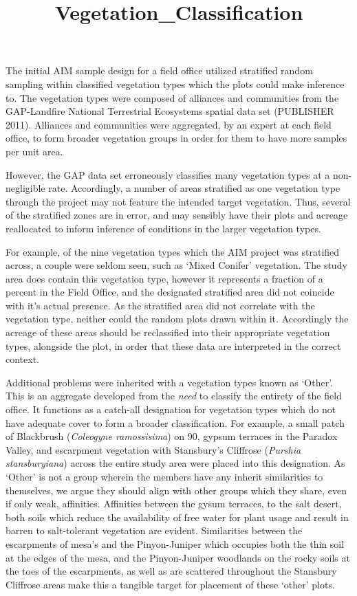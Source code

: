 \documentclass[
]{article}
\title{Vegetation\_Classification}
\author{}
\date{\vspace{-2.5em}}
\begin{document}
\maketitle

The initial AIM sample design for a field office utilized stratified
random sampling within classified vegetation types which the plots could
make inference to. The vegetation types were composed of alliances and
communities from the GAP-Landfire National Terrestrial Ecosystems
spatial data set (PUBLISHER 2011). Alliances and communities were
aggregated, by an expert at each field office, to form broader
vegetation groups in order for them to have more samples per unit area.

However, the GAP data set erroneously classifies many vegetation types
at a non-negligible rate. Accordingly, a number of areas stratified as
one vegetation type through the project may not feature the intended
target vegetation. Thus, several of the stratified zones are in error,
and may sensibly have their plots and acreage reallocated to inform
inference of conditions in the larger vegetation types.

For example, of the nine vegetation types which the AIM project was
stratified across, a couple were seldom seen, such as `Mixed Conifer'
vegetation. The study area does contain this vegetation type, however it
represents a fraction of a percent in the Field Office, and the
designated stratified area did not coincide with it's actual presence.
As the stratified area did not correlate with the vegetation type,
neither could the random plots drawn within it. Accordingly the acreage
of these areas should be reclassified into their appropriate vegetation
types, alongside the plot, in order that these data are interpreted in
the correct context.

Additional problems were inherited with a vegetation types known as
`Other'. This is an aggregate developed from the \emph{need} to classify
the entirety of the field office. It functions as a catch-all
designation for vegetation types which do not have adequate cover to
form a broader classification. For example, a small patch of Blackbrush
(\emph{Coleogyne ramossisima}) on 90, gypsum terraces in the Paradox
Valley, and escarpment vegetation with Stansbury's Cliffrose
(\emph{Purshia stansburyiana}) across the entire study area were placed
into this designation. As `Other' is not a group wherein the members
have any inherit similarities to themselves, we argue they should align
with other groups which they share, even if only weak, affinities.
Affinities between the gysum terraces, to the salt desert, both soils
which reduce the availability of free water for plant usage and result
in barren to salt-tolerant vegetation are evident. Similarities between
the escarpments of mesa's and the Pinyon-Juniper which occupies both the
thin soil at the edges of the mesa, and the Pinyon-Juniper woodlands on
the rocky soils at the toes of the escarpments, as well as are scattered
throughout the Stansbury Cliffrose areas make this a tangible target for
placement of these `other' plots.
\end{document}
